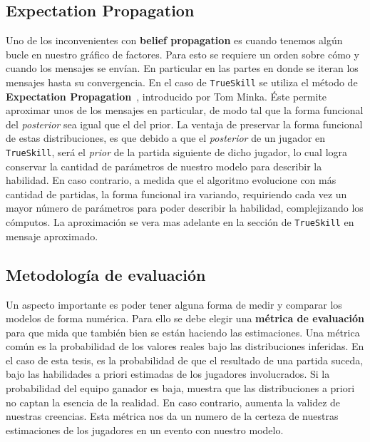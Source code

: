 \documentclass[11pt,twoside,spanish]{report} %
\begin{document}
\subsection{Expectation Propagation}
Uno de los inconvenientes con \textbf{belief propagation} es cuando tenemos alg\'un bucle en nuestro gr\'afico de factores.
Para esto se requiere un orden sobre c\'omo y cuando los mensajes se env\'ian.
En particular en las partes en donde se iteran los mensajes hasta su convergencia.
En el caso de \texttt{TrueSkill} se utiliza el m\'etodo de \textbf{Expectation Propagation}~\cite{herbrich2005}, introducido por Tom Minka.
\'Este permite aproximar unos de los mensajes en particular, de modo tal que  la forma funcional del \textit{posterior} sea igual que el del prior.
La ventaja de preservar la forma funcional de estas distribuciones, es que debido a que el \textit{posterior} de un jugador en \texttt{TrueSkill},  ser\'a el \textit{prior} de la partida siguiente de dicho jugador, lo cual logra conservar la cantidad de par\'ametros de nuestro modelo para describir la habilidad.
En caso contrario, a medida que el algoritmo evolucione con m\'as cantidad de partidas, la forma funcional ira variando, requiriendo cada vez un mayor n\'umero de par\'ametros para poder describir la habilidad, complejizando los c\'omputos.
La aproximaci\'on se vera mas adelante en la secci\'on de \texttt{TrueSkill} en mensaje aproximado.






\subsection{Metodolog\'ia de evaluaci\'on}

Un aspecto importante es poder tener alguna forma de medir y comparar los modelos de forma num\'erica.
Para ello se debe elegir una \textbf{m\'etrica de evaluaci\'on} para que mida que tambi\'en bien se est\'an haciendo las estimaciones.
Una m\'etrica com\'un es la probabilidad de los valores reales bajo las distribuciones inferidas.
En el caso de esta tesis, es la probabilidad de que el resultado de una partida suceda, bajo las habilidades a priori estimadas de los jugadores involucrados.
Si la probabilidad del equipo ganador es baja, muestra que las distribuciones a priori no captan la esencia de la realidad.
En caso contrario, aumenta la validez de nuestras creencias.
Esta m\'etrica nos da un numero de la certeza de nuestras estimaciones de los jugadores en un evento con nuestro modelo.
\end{document}
